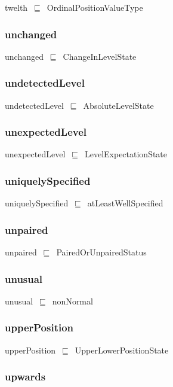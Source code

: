 \documentclass{article}
\begin{document}
twelth~\ensuremath{\sqsubseteq}~OrdinalPositionValueType~

\subsubsection*{unchanged}

unchanged~\ensuremath{\sqsubseteq}~ChangeInLevelState~

\subsubsection*{undetectedLevel}

undetectedLevel~\ensuremath{\sqsubseteq}~AbsoluteLevelState~

\subsubsection*{unexpectedLevel}

unexpectedLevel~\ensuremath{\sqsubseteq}~LevelExpectationState~

\subsubsection*{uniquelySpecified}

uniquelySpecified~\ensuremath{\sqsubseteq}~atLeastWellSpecified~

\subsubsection*{unpaired}

unpaired~\ensuremath{\sqsubseteq}~PairedOrUnpairedStatus~

\subsubsection*{unusual}

unusual~\ensuremath{\sqsubseteq}~nonNormal~

\subsubsection*{upperPosition}

upperPosition~\ensuremath{\sqsubseteq}~UpperLowerPositionState~

\subsubsection*{upwards}
\end{document}
